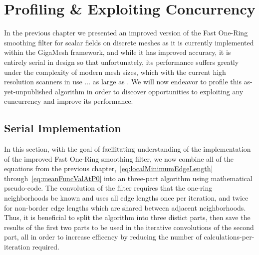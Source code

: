 \chapter{Profiling \& Exploiting Concurrency}
\label{ch5}
In the previous chapter we presented an improved version of the Fast One-Ring smoothing filter for scalar fields on discrete meshes as it is currently implemented within the GigaMesh framework, and while it has improved accuracy, it is entirely serial in design so that unfortunately, its performance suffers greatly under the complexity of modern mesh sizes, which with the current high resolution scanners in use ... as large as . We will now endeavor to profile this as-yet-unpublished algorithm in order to discover opportunities to exploiting any cuncurrency and improve its performance.
%
%
%
%
%
\section{Serial Implementation}
\label{ch5sSI}
In this section, with the goal of \sout{facilitating} understanding of the implementation of the improved Fast One-Ring smoothing filter, we now combine all of the equations from the previous chapter,~\ref{eq:localMinimumEdgeLength} through~\ref{eq:meanFuncValAtP0} into an three-part algorithm using mathematical pseudo-code.  The convolution of the filter requires that the one-ring neighborhoods be known and uses all edge lengths once per iteration, and twice for non-border edge lengths which are shared between adjacent neighborhoods. Thus, it is beneficial to split the algorithm into three distict parts, then save the results of the first two parts to be used in the iterative convolutions of the second part, all in order to increase efficency by reducing the number of calculations-per-iteration required.
%
%
%
